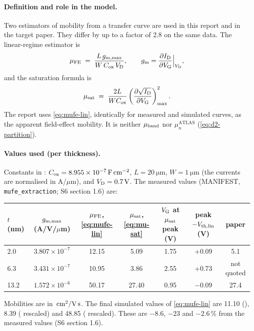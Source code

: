 \paragraph{Definition and role in the model.}
Two estimators of mobility from a transfer curve are used in this report and in the target paper. They differ by up to a factor of 2.8 on the same data. The linear-regime estimator is
\begin{equation}
  \mu_{\mathrm{FE}} \;=\; \frac{L\,g_{\mathrm{m,max}}}{W\,C_{\mathrm{ox}}\,V_{\mathrm{D}}},\qquad g_{\mathrm{m}}=\frac{\partial I_{\mathrm{D}}}{\partial V_{\mathrm{G}}}\Big|_{V_{\mathrm{D}}},
  \label{eq:mufe-lin}
\end{equation}
and the saturation formula is
\begin{equation}
  \mu_{\mathrm{sat}} \;=\; \frac{2L}{WC_{\mathrm{ox}}}\left(\frac{\partial\sqrt{I_{\mathrm{D}}}}{\partial V_{\mathrm{G}}}\right)^{2}_{\max}.
  \label{eq:mu-sat}
\end{equation}
The report uses \cref{eq:mufe-lin}, identically for measured and simulated curves, as the apparent field-effect mobility. It is neither $\mu_{\mathrm{band}}$ nor $\mu_n^{\mathrm{ATLAS}}$ (\cref{eq:d2-partition}).

\paragraph{Values used (per thickness).}
Constants in : $C_{\mathrm{ox}}=\SI{8.955e-7}{\farad\per\centi\metre\squared}$, $L=\SI{20}{\micro\metre}$, $W=\SI{1}{\micro\metre}$ (the currents are normalised in A/$\mu$m), and $V_{\mathrm{D}}=\SI{0.7}{V}$. The measured values (MANIFEST, \texttt{mufe\_extraction}; S6 section 1.6) are:
\begin{center}
\small
\begin{tabular}{@{}lcccccc@{}}
\toprule
$t$ (nm) & $g_{\mathrm{m,max}}$ (A/V/$\mu$m) & $\mu_{\mathrm{FE}}$, \cref{eq:mufe-lin} & $\mu_{\mathrm{sat}}$, \cref{eq:mu-sat} & $V_{\mathrm{G}}$ at $\mu_{\mathrm{sat}}$ peak (V) & peak $-V_{\mathrm{th,lin}}$ (V) & paper \\
\midrule
2.0  & $3.807\times10^{-7}$ & 12.15 & 5.09  & 1.75 & +0.09 & 5.1 \\
6.3  & $3.431\times10^{-7}$ & 10.95 & 3.86  & 2.55 & +0.73 & not quoted \\
13.2 & $1.572\times10^{-6}$ & 50.17 & 27.40 & 0.95 & $-0.09$ & 27.4 \\
\bottomrule
\end{tabular}
\end{center}
Mobilities are in $\,\mathrm{cm}^{2}/\mathrm{V\,s}$. The final simulated values of \cref{eq:mufe-lin} are 11.10 (), 8.39 ( rescaled) and 48.85 ( rescaled). These are $-8.6$, $-23$ and $-2.6$\,\% from the measured values (S6 section 1.6).

